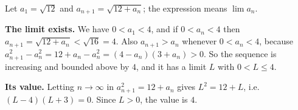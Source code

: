 Let $a_1=\sqrt{12}$ and $a_{n+1}=\sqrt{12+a_n}$; the expression means $\lim a_n$.

\textbf{The limit exists.} We have $0<a_1<4$, and if $0<a_n<4$ then $a_{n+1}=\sqrt{12+a_n}<\sqrt{16}=4$. Also $a_{n+1}>a_n$ whenever $0<a_n<4$, because $a_{n+1}^2-a_n^2=12+a_n-a_n^2=(4-a_n)(3+a_n)>0$. So the sequence is increasing and bounded above by $4$, and it has a limit $L$ with $0<L\le4$.

\textbf{Its value.} Letting $n\to\infty$ in $a_{n+1}^2=12+a_n$ gives $L^2=12+L$, i.e. $(L-4)(L+3)=0$. Since $L>0$, the value is $\boxed{4}$.

